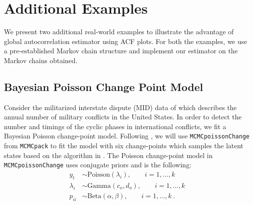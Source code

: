 \documentclass[11pt]{article}
\theoremstyle{remark}
\begin{document}
\section{Additional Examples}
We present two additional real-world examples to illustrate the advantage of global autocorrelation estimator using ACF plots. For both the examples, we use a pre-established Markov chain structure and implement our estimator on the Markov chains obtained.
\subsection{Bayesian Poisson Change Point Model}


Consider the militarized interstate dispute (MID) data of \cite{martin2011mcmcpack} which describes the annual number of military conflicts in the United States. In order to detect the number and timings of the cyclic phases in international conflicts, we fit a Bayesian Poisson change-point model. Following \cite{martin2011mcmcpack}, we will use \texttt{MCMCpoissonChange} from \texttt{MCMCpack} to fit the model with six change-points which samples the latent states based on the algorithm in \cite{chib1998estimation}. The Poisson change-point model in \texttt{MCMCpoissonChange} uses conjugate priors and is the following:
%
\begin{align*}
    y_t &\sim \text{Poisson}(\lambda_i), \qquad i = 1, ..., k\\
    \lambda_i &\sim \text{Gamma}(c_o, d_o), \qquad i = 1,..., k\\
    p_{ii} &\sim \text{Beta}(\alpha, \beta), \qquad i = 1,..., k\,.
\end{align*}
\end{document}
